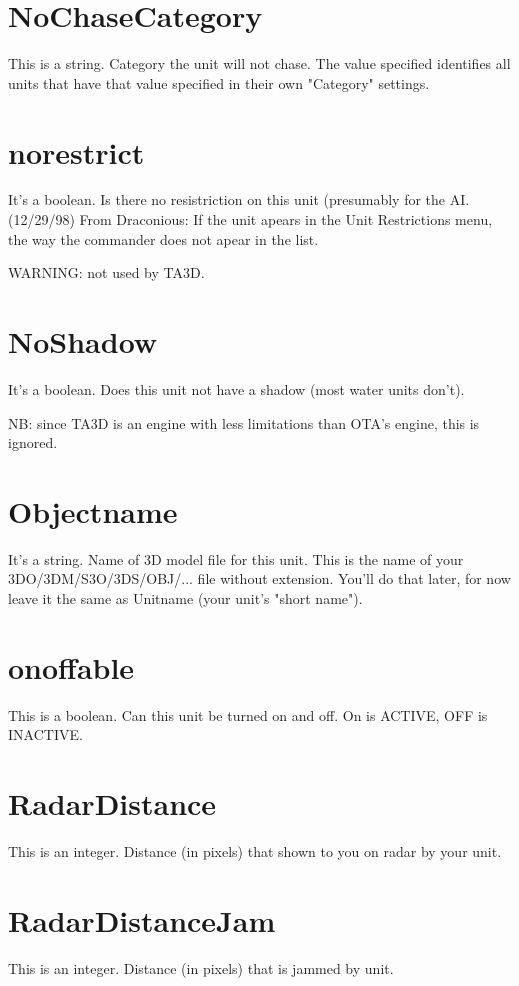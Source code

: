 \documentclass[a4paper,10pt]{article}
\begin{document}
\section{NoChaseCategory}
This is a string. Category the unit will not chase. The value specified identifies all units that have that value specified in their own "Category" settings.

\section{norestrict}
It's a boolean. Is there no resistriction on this unit (presumably for the AI.  (12/29/98) From Draconious:  If the unit apears in the Unit Restrictions menu, the way the commander does not apear in the list.

WARNING: not used by TA3D.

\section{NoShadow}
It's a boolean. Does this unit not have a shadow (most water units don't).

NB: since TA3D is an engine with less limitations than OTA's engine, this is ignored.

\section{Objectname}
It's a string. Name of 3D model file for this unit. This is the name of your 3DO/3DM/S3O/3DS/OBJ/... file without extension. You'll do that later, for now leave it the same as Unitname (your unit's "short name").

\section{onoffable}
This is a boolean. Can this unit be turned on and off. On is ACTIVE, OFF is INACTIVE.

\section{RadarDistance}
This is an integer. Distance (in pixels) that shown to you on radar by your unit.

\section{RadarDistanceJam}
This is an integer. Distance (in pixels) that is jammed by unit.
\end{document}
